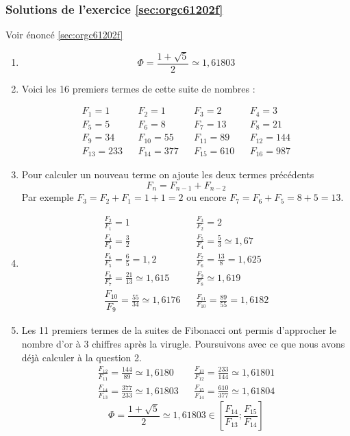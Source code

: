 \documentclass[a4paper, 11pt, twoside]{article}
\begin{document}
\subsubsection{Solutions de l'exercice \ref{sec:orgc61202f}}
\label{sec:orgccb4036}
Voir énoncé \ref{sec:orgc61202f}

\begin{enumerate}
\item \[\Phi = \dfrac{1 + \sqrt{5}}{2} \simeq 1,61803\]
\item Voici les 16 premiers termes de cette suite de nombres :

\begin{align*}
F_1 = 1&& F_2 = 1&& F_3 = 2&& F_4 = 3\\
F_5 = 5&& F_6 = 8&& F_7 = 13&& F_8 = 21\\
F_9 = 34&& F_{10} = 55&& F_{11} = 89&& F_{12} = 144\\
F_{13} = 233&& F_{14} = 377&& F_{15} = 610&& F_{16} = 987
\end{align*}

\item Pour calculer un nouveau terme on ajoute les deux termes
précédents \[F_n = F_{n - 1} + F_{n-2}\]
Par exemple \(F_3 = F_2 + F_1 = 1 + 1 = 2\) ou encore \(F_7 =
       F_6 + F_5 = 8 + 5 = 13\).
\item \begin{align*}
\frac{F_2}{F_1} = 1&& \frac{F_3}{F_2} = 2\\
\frac{F_4}{F_3} = \frac{3}{2}&& \frac{F_5}{F_4} =
\frac{5}{3}\simeq 1,67\\
\frac{F_6}{F_5} = \frac{6}{5} = 1,2&&\frac{F_7}{F_6} =
\frac{13}{8} = 1,625\\
\frac{F_8}{F_7} = \frac{21}{13}\simeq
1,615&&\frac{F_9}{F_8}\simeq 1,619\\
\dfrac{F_{10}}{F_9} = \frac{55}{34}\simeq 1,6176&&
\frac{F_{11}}{F_{10}} = \frac{89}{55} = 1,6182
\end{align*}
\item Les 11 premiers termes de la suites de Fibonacci ont permis
d'approcher le nombre d'or à 3 chiffres après la
virugle. Poursuivons avec ce que nous avons déjà calculer à la
question 2.
\begin{align*}
\frac{F_{12}}{F_{11}} = \frac{144}{89}\simeq 1,6180&&\frac{F_{13}}{F_{12}} = \frac{233}{144}\simeq 1,61801\\
\frac{F_{14}}{F_{13}} = \frac{377}{233}\simeq 1,61803&&\frac{F_{15}}{F_{14}} = \frac{610}{377}\simeq 1,61804
\end{align*}
\[\Phi = \dfrac{1 + \sqrt{5}}{2} \simeq 1,61803\in
       \left[\dfrac{F_{14}}{F_{13}} ; \dfrac{F_{15}}{F_{14}}\right]\]
\end{enumerate}
\end{document}
